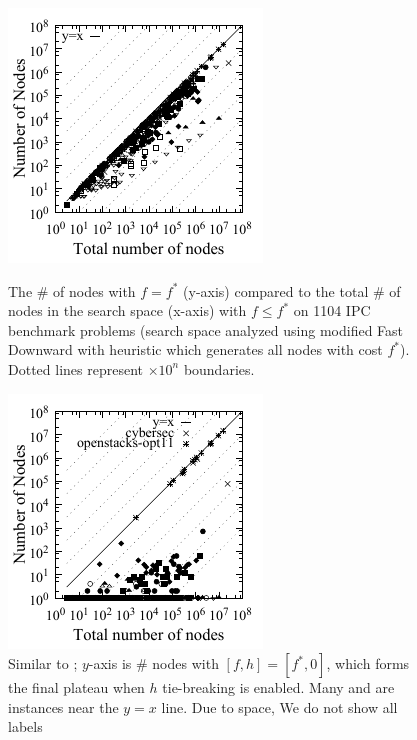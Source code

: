 \begin{figure}[bt]
 \newcommand{\minilength}{0.36\textwidth}
 \newcommand{\minisep}{0.02\textwidth}
 \begin{minipage}[t]{\minilength}
  \centering
 \includegraphics{tables/aaai16-frontier/aaai16prelim3/lmcut_frontier_noh-front-mono.pdf}
 \caption{
 The \# of nodes with $f=f^*$ (y-axis) compared to the
 total \# of nodes in the search space (x-axis) with $f\leq f^*$ on 1104 IPC benchmark problems
  (search space analyzed using modified Fast Downward with \lmcut heuristic which 
  generates all nodes with cost $f^*$).
  Dotted lines represent $\times 10^n$ boundaries.
  }
 \label{fig:plateau-noh}
 \end{minipage}
 \hfill
 \begin{minipage}[t]{\minilength}
  \centering
  \includegraphics{tables/aaai16-frontier/aaai16prelim3/lmcut_frontier-front-mono.pdf}
  \caption{
  Similar to ; $y$-axis is
  \# nodes with $[f,h]=[f^*,0]$, which forms the final
  plateau when $h$ tie-breaking is enabled.
  Many  and  are instances near the $y=x$ line.
  Due to space, We do not show all labels
}
\end{minipage}
\end{figure}
